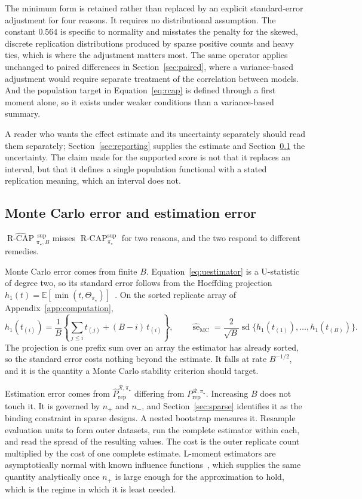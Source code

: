 \documentclass[11pt]{article}
\newcommand{\Regime}{\mathcal{R}}
\newcommand{\E}{\mathbb{E}}
\newcommand{\RCAP}{\operatorname{R\text{-}CAP}^{\mathrm{sup}}_{\pi_\star}}
\newcommand{\RCAPHatB}{\widehat{\operatorname{R\text{-}CAP}}{}^{\,\mathrm{sup}}_{\pi_\star,B}}
\newcommand{\PRep}{P_{\mathrm{rep}}^{\Regime,\pi_\star}}
\newcommand{\PRepHat}{\widehat{P}_{\mathrm{rep}}^{\Regime,\pi_\star}}
\theoremstyle{remark}
\begin{document}
The minimum form is retained rather than replaced by an explicit standard-error adjustment for four reasons. It requires no distributional assumption. The constant $0.564$ is specific to normality and misstates the penalty for the skewed, discrete replication distributions produced by sparse positive counts and heavy ties, which is where the adjustment matters most. The same operator applies unchanged to paired differences in Section~\ref{sec:paired}, where a variance-based adjustment would require separate treatment of the correlation between models. And the population target in Equation~\eqref{eq:rcap} is defined through a first moment alone, so it exists under weaker conditions than a variance-based summary.

A reader who wants the effect estimate and its uncertainty separately should read them separately; Section~\ref{sec:reporting} supplies the estimate and Section~\ref{sec:error} the uncertainty. The claim made for the supported score is not that it replaces an interval, but that it defines a single population functional with a stated replication meaning, which an interval does not.

\subsection{Monte Carlo error and estimation error}
\label{sec:error}

$\RCAPHatB$ misses $\RCAP$ for two reasons, and the two respond to different remedies.

Monte Carlo error comes from finite $B$. Equation~\eqref{eq:uestimator} is a U-statistic of degree two, so its standard error follows from the Hoeffding projection $h_1(t)=\E[\min(t,\Theta_{\pi_\star})]$~\cite{hoeffding1948ustat}. On the sorted replicate array of Appendix~\ref{app:computation},
\begin{equation}
h_1(t_{(i)})
=
\frac{1}{B}
\left\{
\sum_{j\leq i}t_{(j)}
+
(B-i)\,t_{(i)}
\right\},
\qquad
\widehat{\operatorname{se}}_{\mathrm{MC}}
=
\frac{2}{\sqrt{B}}
\operatorname{sd}\{h_1(t_{(1)}),\ldots,h_1(t_{(B)})\}.
\label{eq:mcse}
\end{equation}
The projection is one prefix sum over an array the estimator has already sorted, so the standard error costs nothing beyond the estimate. It falls at rate $B^{-1/2}$, and it is the quantity a Monte Carlo stability criterion should target.

Estimation error comes from $\PRepHat$ differing from $\PRep$. Increasing $B$ does not touch it. It is governed by $n_+$ and $n_-$, and Section~\ref{sec:sparse} identifies it as the binding constraint in sparse designs. A nested bootstrap measures it. Resample evaluation units to form outer datasets, run the complete estimator within each, and read the spread of the resulting values. The cost is the outer replicate count multiplied by the cost of one complete estimate. L-moment estimators are asymptotically normal with known influence functions~\cite{hosking1990lmoments}, which supplies the same quantity analytically once $n_+$ is large enough for the approximation to hold, which is the regime in which it is least needed.
\end{document}
